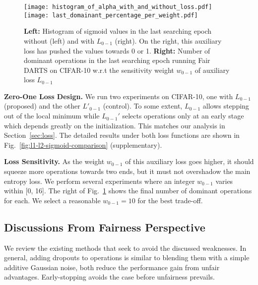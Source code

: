 \documentclass[runningheads]{llncs}
\begin{document}
\begin{figure}[ht]
	\centering
	\texttt{[image: histogram\_of\_alpha\_with\_and\_without\_loss.pdf]}
	\hskip 0.1in
	\texttt{[image: last\_domainant\_percentage\_per\_weight.pdf]}
\caption{\textbf{Left:} Histogram of sigmoid values in the last searching epoch without (left) and with $L_{0-1}$ (right). On the right, this auxiliary loss has pushed the values towards 0 or 1. \textbf{Right:} Number of dominant operations in the last searching epoch running Fair DARTS on CIFAR-10 w.r.t the sensitivity weight $w_{0-1}$ of auxiliary loss $L_{0-1}$}
	\label{fig:histo-loss-and-weight-dominant}
\end{figure} 

\textbf{Zero-One Loss Design.}
We run two experiments on CIFAR-10, one with $L_{0-1}$ (proposed) and the other $L'_{0-1}$ (control). To some extent, $L_{0-1}$ allows stepping out of the local minimum while $L_{0-1}'$ selects operations only at an early stage which depends greatly on the initialization. This matches our analysis in Section~\ref{sec:loss}. The detailed results under both loss functions are shown in Fig.~\ref{fig:l1-l2-sigmoid-comparison} (supplementary). 


\textbf{Loss Sensitivity.} As the weight $w_{0-1}$ of this auxiliary loss goes higher, it should squeeze more operations towards two ends, but it must not overshadow the main entropy loss. We perform several experiments where an integer $w_{0-1}$ varies within [0, 16]. The right of Fig.~\ref{fig:histo-loss-and-weight-dominant} shows the final number of dominant operations for each. We select a reasonable $w_{0-1}=10$ for the best trade-off.












\subsection{Discussions From Fairness Perspective}\label{sec:discussion}

We review the existing methods that seek to avoid the discussed weaknesses. In general, adding dropouts  \cite{chen2019progressive,zela2020understanding} to operations is similar to blending them with a simple additive Gaussian noise, both reduce the performance gain from unfair advantages. Early-stopping \cite{liang2019darts} avoids the case before unfairness prevails.
\end{document}
